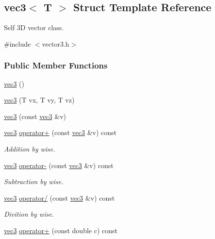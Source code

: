 \hypertarget{structvec3}{}\subsection{vec3$<$ T $>$ Struct Template Reference}
\label{structvec3}


Self 3D vector class.  




{\ttfamily \#include $<$vector3.\+h$>$}

\subsubsection*{Public Member Functions}
\begin{DoxyCompactItemize}
\item 
\mbox{\hyperlink{structvec3_afb7342872bc442bf0da6a7da1671e77e}{vec3}} ()
\item 
\mbox{\hyperlink{structvec3_a9cdcc79d7383d2676ae1f5701c481607}{vec3}} (T vx, T vy, T vz)
\item 
\mbox{\hyperlink{structvec3_ac0d73cf98ccc9b3cb39e6f58e92dab9f}{vec3}} (const \mbox{\hyperlink{structvec3}{vec3}} \&v)
\item 
\mbox{\hyperlink{structvec3}{vec3}} \mbox{\hyperlink{structvec3_a255037f59863e54390e388dd07e7ee8f}{operator+}} (const \mbox{\hyperlink{structvec3}{vec3}} \&v) const
\begin{DoxyCompactList}\small\item\em Addition by wise. \end{DoxyCompactList}\item 
\mbox{\hyperlink{structvec3}{vec3}} \mbox{\hyperlink{structvec3_a62ca43535073d9711fe179e26a412e32}{operator-\/}} (const \mbox{\hyperlink{structvec3}{vec3}} \&v) const
\begin{DoxyCompactList}\small\item\em Subtraction by wise. \end{DoxyCompactList}\item 
\mbox{\hyperlink{structvec3}{vec3}} \mbox{\hyperlink{structvec3_ad2f8afc304554e7b5d7331030e8bc91d}{operator/}} (const \mbox{\hyperlink{structvec3}{vec3}} \&v) const
\begin{DoxyCompactList}\small\item\em Divition by wise. \end{DoxyCompactList}\item 
\mbox{\hyperlink{structvec3}{vec3}} \mbox{\hyperlink{structvec3_a479dd2445daeeec47e6a5a8e4487f51b}{operator+}} (const double c) const

\end{DoxyCompactItemize}

